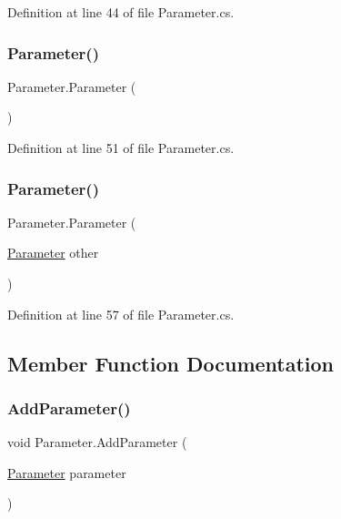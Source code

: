 Definition at line 44 of file Parameter.\+cs.

\mbox{\label{class_parameter_a77021d9f8462136ddac5b1bcf75af72e}} 
\subsubsection{\texorpdfstring{Parameter()}{Parameter()}\hspace{0.1cm}{\footnotesize\ttfamily [4/5]}}
{\footnotesize\ttfamily Parameter.\+Parameter (\begin{DoxyParamCaption}{ }\end{DoxyParamCaption})}



Definition at line 51 of file Parameter.\+cs.

\mbox{\label{class_parameter_a35b2ff8d912489cf358b4d69d39f55a0}} 
\subsubsection{\texorpdfstring{Parameter()}{Parameter()}\hspace{0.1cm}{\footnotesize\ttfamily [5/5]}}
{\footnotesize\ttfamily Parameter.\+Parameter (\begin{DoxyParamCaption}\item[{\hyperlink{class_parameter}{Parameter}}]{other }\end{DoxyParamCaption})}



Definition at line 57 of file Parameter.\+cs.



\subsection{Member Function Documentation}
\mbox{\label{class_parameter_a0aa6dd5ff84c7809a29c52f335af609f}} 
\subsubsection{\texorpdfstring{Add\+Parameter()}{AddParameter()}}
{\footnotesize\ttfamily void Parameter.\+Add\+Parameter (\begin{DoxyParamCaption}\item[{\hyperlink{class_parameter}{Parameter}}]{parameter }\end{DoxyParamCaption})}



